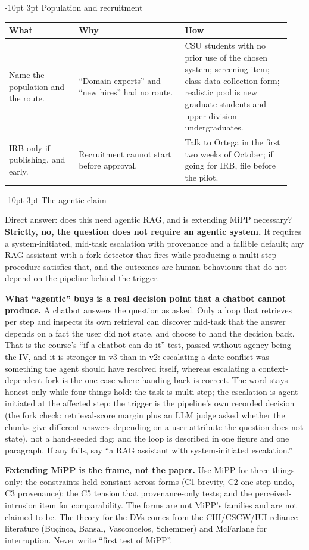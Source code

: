 \documentclass[9pt,letterpaper]{extarticle}
\makeatletter
\newcommand{\rowsep}{\noalign{\vskip 1.5pt}\arrayrulecolor{black!35}\hline\arrayrulecolor{black}\noalign{\vskip 1.5pt}}
\renewcommand\section{\@startsection{section}{1}{\z@}%
  {-10pt \@plus -2pt \@minus -1pt}{3pt}%
  {\sffamily\bfseries\large\color{accent}}}
\let\oldsection\section
\renewcommand{\section}{\needspace{7\baselineskip}\oldsection}
\newcommand{\wwh}{\toprule
\sffamily\bfseries\color{accent} What & \sffamily\bfseries\color{accent} Why & \sffamily\bfseries\color{accent} How \\
\midrule}
\newenvironment{wwhtable}{\footnotesize
\begin{longtable}{@{}>{\raggedright\arraybackslash}p{0.23\linewidth}>{\raggedright\arraybackslash}p{0.355\linewidth}>{\raggedright\arraybackslash}p{0.355\linewidth}@{}}
\wwh}{\bottomrule\end{longtable}}
\makeatother
\begin{document}
\section{Population and recruitment}
\begin{wwhtable}
Name the population and the route. &
``Domain experts'' and ``new hires'' had no route. &
CSU students with no prior use of the chosen system; screening item; class
data-collection form; realistic pool is new graduate students and
upper-division undergraduates. \\
\rowsep
IRB only if publishing, and early. &
Recruitment cannot start before approval. &
Talk to Ortega in the first two weeks of October; if going for IRB, file
before the pilot. \\
\end{wwhtable}

\section{The agentic claim}
\begin{answerbox}{Direct answer: does this need agentic RAG, and is extending MiPP necessary?}
\textbf{Strictly, no, the question does not require an agentic system.} It
requires a system-initiated, mid-task escalation with provenance and a
fallible default; any RAG assistant with a fork detector that fires while
producing a multi-step procedure satisfies that, and the outcomes are human
behaviours that do not depend on the pipeline behind the trigger.

\textbf{What ``agentic'' buys is a real decision point that a chatbot cannot
produce.} A chatbot answers the question as asked. Only a loop that retrieves
per step and inspects its own retrieval can discover mid-task that the answer
depends on a fact the user did not state, and choose to hand the decision back.
That is the course's ``if a chatbot can do it'' test, passed without agency
being the IV, and it is stronger in v3 than in v2: escalating a date conflict
was something the agent should have resolved itself, whereas escalating a
context-dependent fork is the one case where handing back is correct. The word
stays honest only while four things hold: the task is multi-step; the
escalation is agent-initiated at the affected step; the trigger is the
pipeline's own recorded decision (the fork check: retrieval-score margin plus
an LLM judge asked whether the chunks give different answers depending on a
user attribute the question does not state), not a hand-seeded flag; and the
loop is described in one figure and one paragraph. If any fails, say ``a RAG
assistant with system-initiated escalation.''

\textbf{Extending MiPP is the frame, not the paper.} Use MiPP for three things
only: the constraints held constant across forms (C1 brevity, C2 one-step undo,
C3 provenance); the C5 tension that provenance-only tests; and the
perceived-intrusion item for comparability. The forms are not MiPP's families
and are not claimed to be. The theory for the DVs comes from the CHI/CSCW/IUI
reliance literature (Bu\c{c}inca, Bansal, Vasconcelos, Schemmer) and McFarlane
for interruption. Never write ``first test of MiPP''.
\end{answerbox}
\end{document}
